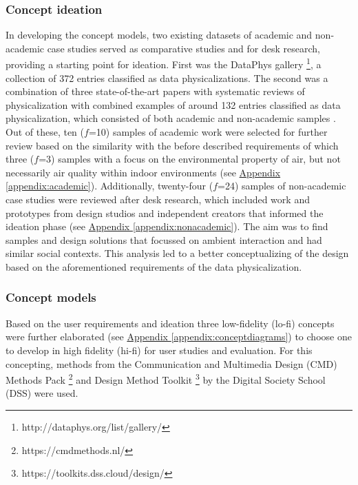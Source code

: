 \subsubsection{Concept ideation}
In developing the concept models, two existing datasets of academic and non-academic case studies served as comparative studies and for desk research, providing a starting point for ideation. First was the DataPhys gallery \footnote{http://dataphys.org/list/gallery/}, a collection of 372 entries classified as data physicalizations. The second was a combination of three state-of-the-art papers with systematic reviews of physicalization with combined examples of around 132 entries classified as data physicalization, which consisted of both academic and non-academic samples \cite{sauve_physecology_2022, anhalt_university_germany_design_2022, ranasinghe_encoding_2023}. Out of these, ten ($f$=10) samples of academic work were selected for further review based on the similarity with the before described requirements of which three ($f$=3) samples with a focus on the environmental property of air, but not necessarily air quality within indoor environments (see \hyperref[appendix:academic]{Appendix \ref*{appendix:academic}}). Additionally, twenty-four ($f$=24) samples of non-academic case studies were reviewed after desk research, which included work and prototypes from design studios and independent creators that informed the ideation phase (see \hyperref[appendix:nonacademic]{Appendix \ref*{appendix:nonacademic}}). The aim was to find samples and design solutions that focussed on ambient interaction and had similar social contexts. This analysis led to a better conceptualizing of the design based on the aforementioned requirements of the data physicalization. 

\subsubsection{Concept models}

Based on the user requirements and ideation three low-fidelity (lo-fi) concepts were further elaborated (see \hyperref[appendix:conceptdiagrams]{Appendix \ref*{appendix:conceptdiagrams}}) to choose one to develop in high fidelity (hi-fi) for user studies and evaluation. For this concepting, methods from the Communication and Multimedia Design (CMD) Methods Pack \footnote{https://cmdmethods.nl/} and Design Method Toolkit \footnote{https://toolkits.dss.cloud/design/} by the Digital Society School (DSS) were used.

